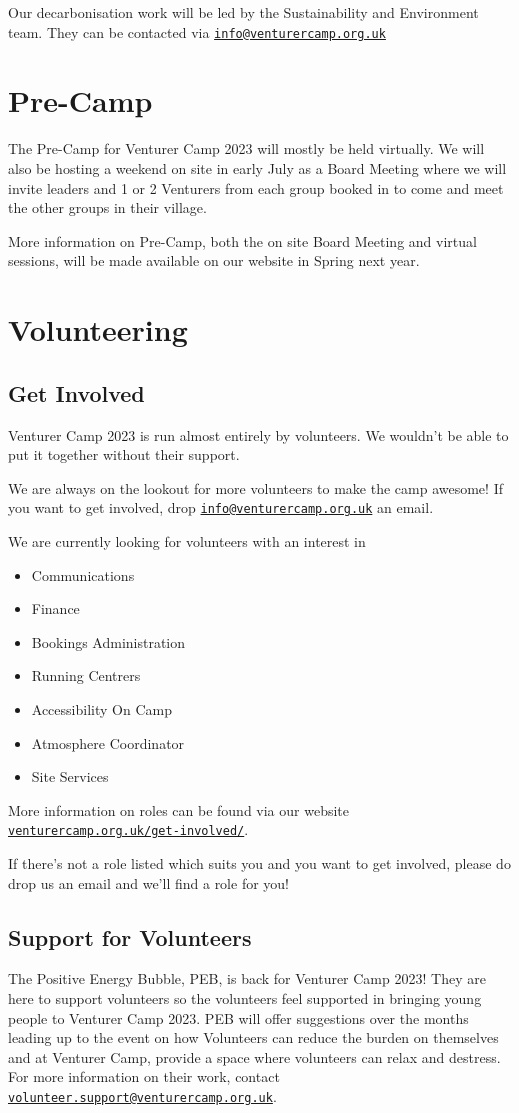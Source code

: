 \documentclass[a4paper, 10pt]{report}
\begin{document}
Our decarbonisation work will be led by the Sustainability and Environment team. They can be contacted via \href{mailto:info@venturercamp.org.uk}{\texttt{info@venturercamp.org.uk}}

\chapter{Pre-Camp}
The Pre-Camp for Venturer Camp 2023 will mostly be held virtually. We will also be hosting a weekend on site in early July as a Board Meeting where we will invite leaders and 1 or 2 Venturers from each group booked in to come and meet the other groups in their village.

More information on Pre-Camp, both the on site Board Meeting and virtual sessions, will be made available on our website in Spring next year. 

\chapter{Volunteering}
\section{Get Involved}
Venturer Camp 2023 is run almost entirely by volunteers. We wouldn't be able to put it together without their support.

We are always on the lookout for more volunteers to make  the camp awesome! If you want to get involved, drop \href{mailto:info@venturercamp.org.uk}{\texttt{info@venturercamp.org.uk}} an email.

We are currently looking for volunteers with an interest in
\begin{itemize}
    \item Communications
    \item Finance
    \item Bookings Administration
    \item Running Centrers
    \item Accessibility On Camp
    \item Atmosphere Coordinator
    \item Site Services
\end{itemize}
More information on roles can be found via our website \href{https://venturercamp.org.uk/get-involved/}{\texttt{venturercamp.org.uk/get-involved/}}. 

If there's not a role listed which suits you and you want to get involved, please do drop us an email and we'll find a role for you! 

\section{Support for Volunteers}
The Positive Energy Bubble, PEB, is back for Venturer Camp 2023! They are here to support volunteers so the volunteers feel supported in bringing young people to Venturer Camp 2023. PEB will offer suggestions over the months leading up to the event on how Volunteers can reduce the burden on themselves and at Venturer Camp, provide a space where volunteers can relax and destress. For more information on their work, contact \href{mailto:volunteer.support@venturercamp.org.uk}{\texttt{volunteer.support@venturercamp.org.uk}}.
\end{document}
